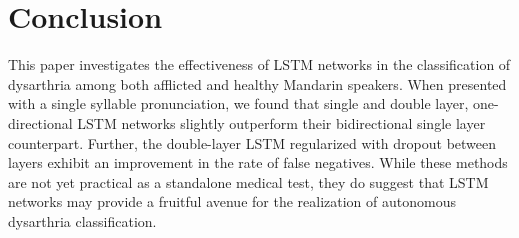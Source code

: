\section{Conclusion}
This paper investigates the effectiveness of LSTM networks in the classification of dysarthria among both afflicted and healthy Mandarin speakers. When presented with a single syllable pronunciation, we found that single and double layer, one-directional LSTM networks slightly outperform their bidirectional single layer counterpart. Further, the double-layer LSTM regularized with dropout between layers exhibit an improvement in the rate of false negatives. While these methods are not yet practical as a standalone medical test, they do suggest that LSTM networks may provide a fruitful avenue for the realization of autonomous dysarthria classification.